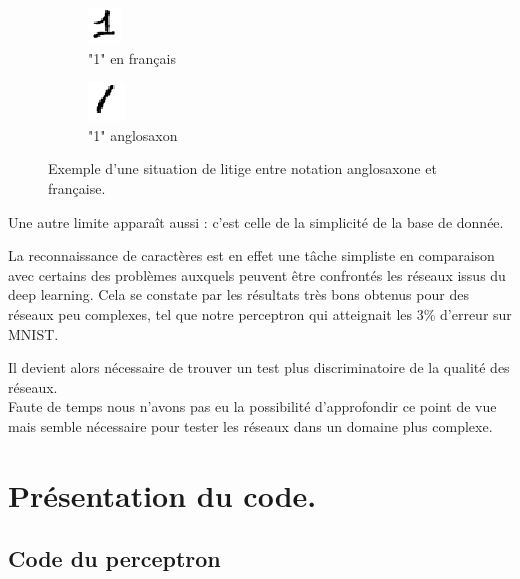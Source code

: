 \documentclass[a4paper,oneside]{report}
\begin{document}
                \begin{figure}[!h]
                    \centering
                    \begin{subfigure}[b]{0.3\textwidth}
                        \centering
                        \includegraphics{Images/mnist-02.png}
                        \caption{"1" en français}
                    \end{subfigure}
                    \hfill
                    \begin{subfigure}[b]{0.3\textwidth}
                        \centering
                        \includegraphics{Images/mnist-03.png}
                        \caption{"1" anglosaxon}
                    \end{subfigure}
                    \caption{Exemple d'une situation de litige entre notation anglosaxone et française.}
                \end{figure}

        Une autre limite apparaît aussi : c'est celle de la simplicité de la base de donnée.

La reconnaissance de caractères est en effet une tâche simpliste en comparaison avec 
certains des problèmes auxquels peuvent être confrontés les réseaux issus du deep 
learning. Cela se constate par 
les résultats très bons obtenus pour des réseaux peu complexes, tel que notre perceptron qui 
atteignait les 3\% d'erreur sur MNIST.

  Il devient alors nécessaire de trouver un test plus discriminatoire de la qualité des 
réseaux.\\

 Faute de temps nous n'avons pas eu la possibilité d'approfondir ce point de vue mais 
semble nécessaire pour tester les réseaux dans un domaine plus complexe.

        \chapter{Présentation du code.}
        
\section{Code du perceptron}
\end{document}
